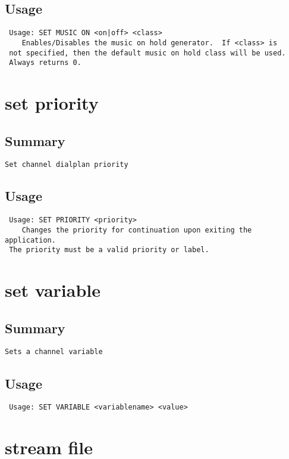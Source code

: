 \subsection{Usage}
\begin{verbatim}
 Usage: SET MUSIC ON <on|off> <class>
	Enables/Disables the music on hold generator.  If <class> is
 not specified, then the default music on hold class will be used.
 Always returns 0.

\end{verbatim}


\section{set priority}
\subsection{Summary}
\begin{verbatim}
Set channel dialplan priority
\end{verbatim}
\subsection{Usage}
\begin{verbatim}
 Usage: SET PRIORITY <priority>
	Changes the priority for continuation upon exiting the application.
 The priority must be a valid priority or label.

\end{verbatim}


\section{set variable}
\subsection{Summary}
\begin{verbatim}
Sets a channel variable
\end{verbatim}
\subsection{Usage}
\begin{verbatim}
 Usage: SET VARIABLE <variablename> <value>

\end{verbatim}


\section{stream file}
